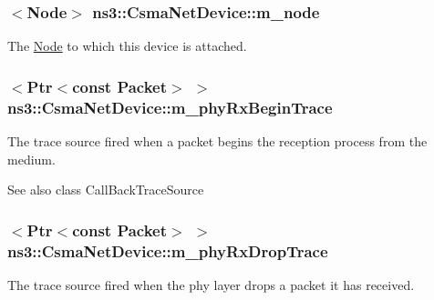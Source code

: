 \subsubsection[{\texorpdfstring{m\+\_\+node}{m_node}}]{$<${\bf Node}$>$ ns3\+::\+Csma\+Net\+Device\+::m\+\_\+node\hspace{0.3cm}{\ttfamily [private]}}\hypertarget{classns3_1_1CsmaNetDevice_a9dbd678469e1b1efe74a45b868ead509}{}\label{classns3_1_1CsmaNetDevice_a9dbd678469e1b1efe74a45b868ead509}
The \hyperlink{classns3_1_1Node}{Node} to which this device is attached. 
\subsubsection[{\texorpdfstring{m\+\_\+phy\+Rx\+Begin\+Trace}{m_phyRxBeginTrace}}]{$<${\bf Ptr}$<$const {\bf Packet}$>$ $>$ ns3\+::\+Csma\+Net\+Device\+::m\+\_\+phy\+Rx\+Begin\+Trace\hspace{0.3cm}{\ttfamily [private]}}\hypertarget{classns3_1_1CsmaNetDevice_abdbb5dd4d62426a5ad0f6cb8cb030b3b}{}\label{classns3_1_1CsmaNetDevice_abdbb5dd4d62426a5ad0f6cb8cb030b3b}
The trace source fired when a packet begins the reception process from the medium.

\begin{DoxySeeAlso}{See also}
class Call\+Back\+Trace\+Source 
\end{DoxySeeAlso}
\subsubsection[{\texorpdfstring{m\+\_\+phy\+Rx\+Drop\+Trace}{m_phyRxDropTrace}}]{$<${\bf Ptr}$<$const {\bf Packet}$>$ $>$ ns3\+::\+Csma\+Net\+Device\+::m\+\_\+phy\+Rx\+Drop\+Trace\hspace{0.3cm}{\ttfamily [private]}}\hypertarget{classns3_1_1CsmaNetDevice_a9413b693a3028dcccb20f653bad58bc0}{}\label{classns3_1_1CsmaNetDevice_a9413b693a3028dcccb20f653bad58bc0}
The trace source fired when the phy layer drops a packet it has received.

